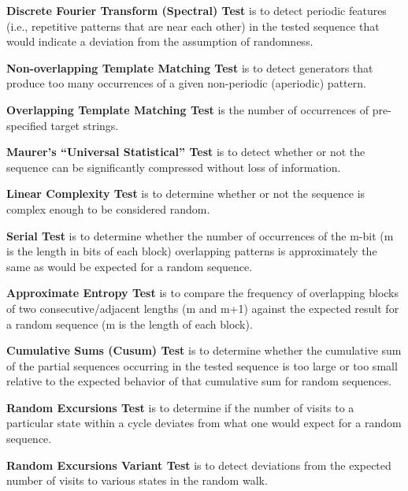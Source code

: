 \documentclass[journal]{IEEEtran}
\begin{document}
\textbf{Discrete Fourier Transform (Spectral) Test} is to detect periodic features (i.e., repetitive patterns that are near each other) in the tested sequence that would indicate a deviation from the assumption of randomness.


\textbf{Non-overlapping Template Matching Test} is to detect generators that produce too many occurrences of a given non-periodic (aperiodic) pattern.


\textbf{Overlapping Template Matching Test} is the number of occurrences of pre-specified target strings.


\textbf{Maurer's ``Universal Statistical'' Test} is to detect whether or not the sequence can be
significantly compressed without loss of information.


\textbf{Linear Complexity Test} is to determine whether or not the sequence is complex enough to be considered random.


\textbf{Serial Test} is to determine whether the number of occurrences of the  m-bit (m is the length in bits of each block) overlapping patterns is approximately the same as would be expected for a random sequence.


\textbf{Approximate Entropy Test} is to compare the frequency of overlapping blocks of two consecutive/adjacent lengths (m and m+1) against the expected result for a random sequence (m is the length of each block).


\textbf{Cumulative Sums (Cusum) Test} is to determine whether the cumulative sum of the partial sequences occurring in the tested sequence is too large or too small relative to the expected behavior of that cumulative sum for random sequences.


\textbf{Random Excursions Test} is to determine if the number of visits to a particular state within a cycle deviates from what one would expect for a random sequence.


\textbf{Random Excursions Variant Test} is to detect deviations from the expected number of visits to various states in the random walk.
\end{document}
